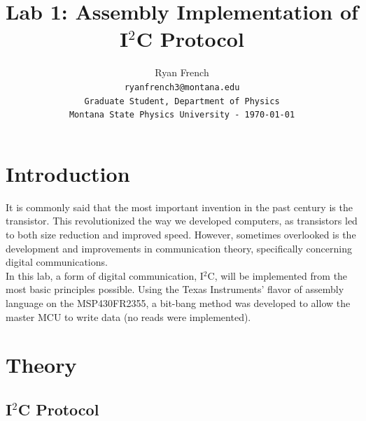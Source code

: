 \documentclass{article}
\title{Lab 1: Assembly Implementation of I\(^2\)C Protocol}
\author{Ryan French\\ \texttt{ryanfrench3@montana.edu}\\ \texttt{Graduate Student, Department of Physics}\\ \texttt{Montana State Physics University - \today}}
\date{}
\begin{document}
\maketitle


\section{Introduction}
\label{sec:Introduction}

It is commonly said that the most important invention in the past century is the transistor. This revolutionized the way we developed computers, as transistors led to both size reduction and improved speed. However, sometimes overlooked is the development and improvements in communication theory, specifically concerning digital communications.\\

In this lab, a form of digital communication, I\(^2\)C, will be implemented from the most basic principles possible. Using the Texas Instruments' flavor of assembly language on the MSP430FR2355, a bit-bang method was developed to allow the master MCU to write data (no reads were implemented).\\




\section{Theory}
\label{sec:Theory}

\subsection{I\(^2\)C Protocol}
\label{sec:I2CProtocol}
\end{document}
